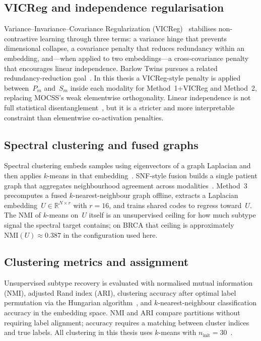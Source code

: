 \subsection{VICReg and independence regularisation}

Variance--Invariance--Covariance Regularization (VICReg)~\citep{bardes2022vicreg} stabilises non-contrastive learning through three terms: a variance hinge that prevents dimensional collapse, a covariance penalty that reduces redundancy within an embedding, and---when applied to two embeddings---a cross-covariance penalty that encourages linear independence. Barlow Twins pursues a related redundancy-reduction goal~\citep{zbontar2021barlow}. In this thesis a VICReg-style penalty is applied between~$P_m$ and~$S_m$ inside each modality for Method~1+VICReg and Method~2, replacing MOCSS's weak elementwise orthogonality. Linear independence is not full statistical disentanglement~\citep{martens2024disentangling}, but it is a stricter and more interpretable constraint than elementwise co-activation penalties.

\subsection{Spectral clustering and fused graphs}

Spectral clustering embeds samples using eigenvectors of a graph Laplacian and then applies $k$-means in that embedding~\citep{ng2002spectral,vonluxburg2007tutorial,lloyd1982least}. SNF-style fusion builds a single patient graph that aggregates neighbourhood agreement across modalities~\citep{wang2014snf}. Method~3 precomputes a fused $k$-nearest-neighbour graph offline, extracts a Laplacian embedding~$U\in\mathbb{R}^{N\times r}$ with $r=16$, and trains shared codes to regress toward~$U$. The NMI of $k$-means on~$U$ itself is an unsupervised ceiling for how much subtype signal the spectral target contains; on BRCA that ceiling is approximately $\mathrm{NMI}(U)\approx 0.387$ in the configuration used here.

\subsection{Clustering metrics and assignment}

Unsupervised subtype recovery is evaluated with normalised mutual information (NMI), adjusted Rand index (ARI), clustering accuracy after optimal label permutation via the Hungarian algorithm~\citep{Kuhn1955Hungarian}, and $k$-nearest-neighbour classification accuracy in the embedding space. NMI and ARI compare partitions without requiring label alignment; accuracy requires a matching between cluster indices and true labels. All clustering in this thesis uses $k$-means with $n_{\mathrm{init}}=30$~\citep{lloyd1982least}.

